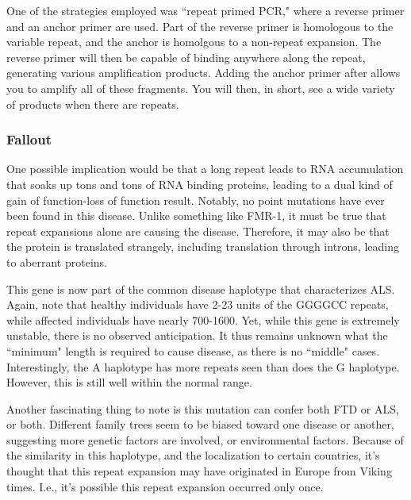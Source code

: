 One of the strategies employed was ``repeat primed PCR," where a reverse primer and an anchor primer are used. Part of the reverse primer is homologous to the variable repeat, and the anchor is homolgous to a non-repeat expansion. The reverse primer will then be capable of binding anywhere along the repeat, generating various amplification products. Adding the anchor primer after allows you to amplify all of these fragments. You will then, in short, see a wide variety of products when there are repeats. 

\subsubsection*{Fallout}

One possible implication would be that a long repeat leads to RNA accumulation that soaks up tons and tons of RNA binding proteins, leading to a dual kind of gain of function-loss of function result. Notably, no point mutations have ever been found in this disease. Unlike something like FMR-1, it must be true that repeat expansions alone are causing the disease. Therefore, it may also be that the protein is translated strangely, including translation through introns, leading to aberrant proteins.\newline

This gene is now part of the common disease haplotype that characterizes ALS. Again, note that healthy individuals have 2-23 units of the GGGGCC repeats, while affected individuals have nearly 700-1600. Yet, while this gene is extremely unstable, there is no observed anticipation. It thus remains unknown what the ``minimum" length is required to cause disease, as there is no ``middle" cases. Interestingly, the A haplotype has more repeats seen than does the G haplotype. However, this is still well within the normal range.\newline

Another fascinating thing to note is this mutation can confer both FTD or ALS, or both. Different family trees seem to be biased toward one disease or another, suggesting more genetic factors are involved, or environmental factors. Because of the similarity in this haplotype, and the localization to certain countries, it's thought that this repeat expansion may have originated in Europe from Viking times. I.e., it's possible this repeat expansion occurred only once. 

 
